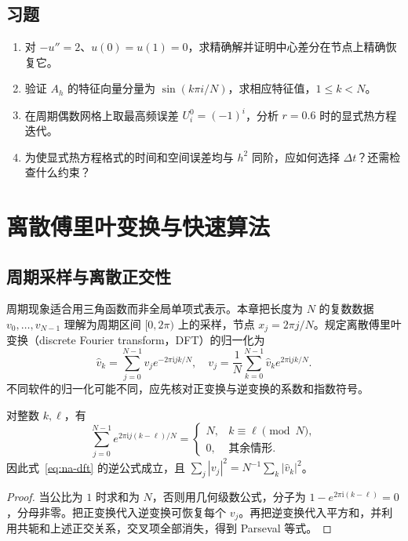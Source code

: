 \documentclass[UTF8,12pt,a4paper,fontset=fandol]{ctexbook}
\begin{document}
\section{习题}
\begin{enumerate}[label=\arabic*.]
\item\label{exr:na-pde-exact} 对 $-u''=2$、$u(0)=u(1)=0$，求精确解并证明中心差分在节点上精确恢复它。
\item\label{exr:na-pde-spectrum} 验证 $A_h$ 的特征向量分量为 $\sin(k\pi i/N)$，求相应特征值，$1\le k<N$。
\item\label{exr:na-pde-stability} 在周期偶数网格上取最高频误差 $U_i^0=(-1)^i$，分析 $r=0.6$ 时的显式热方程迭代。
\item\label{exr:na-pde-mesh} 为使显式热方程格式的时间和空间误差均与 $h^2$ 同阶，应如何选择 $\Delta t$？还需检查什么约束？
\end{enumerate}

\chapter{离散傅里叶变换与快速算法}
\label{chap:na-fourier}

\section{周期采样与离散正交性}
周期现象适合用三角函数而非全局单项式表示。本章把长度为 $N$ 的复数数据 $v_0,\ldots,v_{N-1}$ 理解为周期区间 $[0,2\pi)$ 上的采样，节点 $x_j=2\pi j/N$。规定离散傅里叶变换（discrete Fourier transform，DFT）的归一化为
\begin{equation}
 \widehat v_k=\sum_{j=0}^{N-1}v_j e^{-2\pi\mathrm i jk/N},\quad
 v_j=\frac1N\sum_{k=0}^{N-1}\widehat v_k e^{2\pi\mathrm i jk/N}.
 \label{eq:na-dft}
\end{equation}
不同软件的归一化可能不同，应先核对正变换与逆变换的系数和指数符号。

\begin{proposition}
对整数 $k,\ell$，有
\[
 \sum_{j=0}^{N-1}e^{2\pi\mathrm i j(k-\ell)/N}
 =\begin{cases}N,&k\equiv\ell\pmod N,\\0,&\text{其余情形}.
 \end{cases}
\]
因此式~\eqref{eq:na-dft} 的逆公式成立，且 $\sum_j|v_j|^2=N^{-1}\sum_k|\widehat v_k|^2$。
\end{proposition}
\begin{proof}
当公比为 $1$ 时求和为 $N$，否则用几何级数公式，分子为 $1-e^{2\pi\mathrm i(k-\ell)}=0$，分母非零。把正变换代入逆变换可恢复每个 $v_j$。再把逆变换代入平方和，并利用共轭和上述正交关系，交叉项全部消失，得到 Parseval 等式。
\end{proof}
\end{document}
